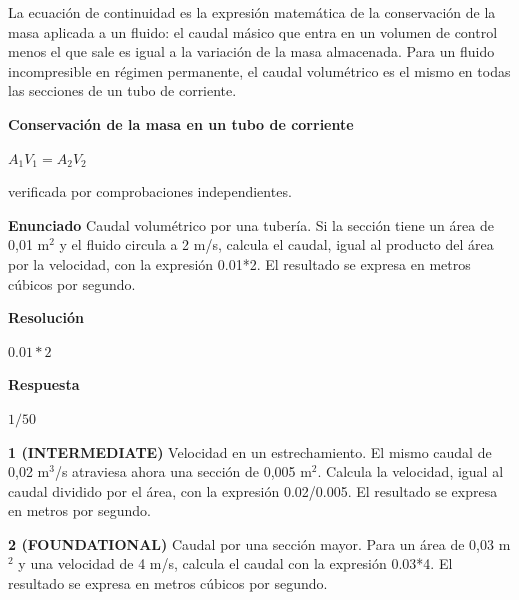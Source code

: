 \documentclass{book}
\begin{document}
\begin{tcolorbox}[title={Definición}, studiumdef, breakable]

La ecuación de continuidad es la expresión matemática de la conservación de la masa aplicada a un fluido: el caudal másico que entra en un volumen de control menos el que sale es igual a la variación de la masa almacenada. Para un fluido incompresible en régimen permanente, el caudal volumétrico es el mismo en todas las secciones de un tubo de corriente.
\end{tcolorbox}

\begin{tcolorbox}[title={Derivaciones}, studiumdef, breakable]

\noindent\textbf{Conservación de la masa en un tubo de corriente}

\(A_1 V_1 = A_2 V_2\)

\noindent\footnotesize verificada por comprobaciones independientes.
\end{tcolorbox}

\begin{tcolorbox}[title={Problema resuelto}, studiumworked, breakable]

\noindent\textbf{Enunciado}
Caudal volumétrico por una tubería. Si la sección tiene un área de 0,01 m\(^{2}\) y el fluido circula a 2 m/s, calcula el caudal, igual al producto del área por la velocidad, con la expresión 0.01*2. El resultado se expresa en metros cúbicos por segundo.

\noindent\textbf{Resolución}

\(0.01*2\)

\noindent\textbf{Respuesta}

\(1/50\)
\end{tcolorbox}

\begin{tcolorbox}[title={Ejercicios}, studiumworked, breakable]

\noindent\textbf{1 (INTERMEDIATE)}
Velocidad en un estrechamiento. El mismo caudal de 0,02 m\(^{3}\)/s atraviesa ahora una sección de 0,005 m\(^{2}\). Calcula la velocidad, igual al caudal dividido por el área, con la expresión 0.02/0.005. El resultado se expresa en metros por segundo.

\noindent\textbf{2 (FOUNDATIONAL)}
Caudal por una sección mayor. Para un área de 0,03 m\(^{2}\) y una velocidad de 4 m/s, calcula el caudal con la expresión 0.03*4. El resultado se expresa en metros cúbicos por segundo.
\end{tcolorbox}
\end{document}
